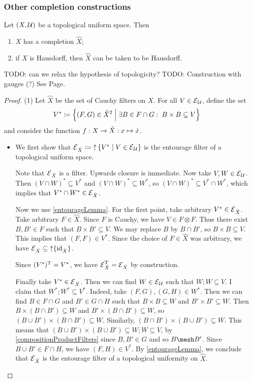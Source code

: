 \subsubsection{Other completion constructions}
\begin{proposition}
Let $\sSet{X, \mathcal{U}}$ be a topological uniform space. Then
\begin{enumerate}
\item $X$ has a completion $\hat{X}$;
\item if $X$ is Hausdorff, then $\hat{X}$ can be taken to be Hausdorff.
\end{enumerate}
\end{proposition}
TODO: can we relax the hypothesis of topologicity? TODO: Construction with gauges (?) See Page.
\begin{proof}
(1) Let $\hat{X}$ be the set of Cauchy filters on $X$. For all $V\in\operatorname{\mathcal{E}}_\mathcal{U}$, define the set
\[ V^* \defeq \setbuilder{(F,G)\in \hat{X}^2}{\exists B\in F\cap G: \; B\times B\subseteq V} \]
and consider the function $f: X\to \hat{X}: x\mapsto \dot{x}$.
\begin{itemize}
\item We first show that $\entourage_{\hat{X}} \defeq \upset\setbuilder{V^*}{V\in \entourage_\mathcal{U}}$ is the entourage filter of a topological uniform space.

Note that $\operatorname{\mathcal{E}}_{\hat{X}}$ is a filter. Upwards closure is immediate. Now take $V,W\in \operatorname{\mathcal{E}}_\mathcal{U}$. Then $(V\cap W)^* \subseteq V^*$ and $(V\cap W)^* \subseteq W^*$, so $(V\cap W)^* \subseteq V^*\cap W^*$, which implies that $V^*\cap W^*\in \operatorname{\mathcal{E}}_{\hat{X}}$.

Now we use \ref{entourageLemma}. For the first point, take arbitrary $V^*\in \operatorname{\mathcal{E}}_{\hat{X}}$. Take arbitrary $F\in \hat{X}$. Since $F$ is Cauchy, we have $V \in F\otimes F$. Thus there exist $B,B'\in F$ such that $B\times B'\subseteq V$. We may replace $B$ by $B\cap B'$, so $B\times B\subseteq V$. This implies that $(F,F) \in V^*$. Since the choice of $F\in \hat{X}$ was arbitrary, we have $\operatorname{\mathcal{E}}_{\hat{X}}\subseteq \operatorname{\uparrow} \{\operatorname{id}_{\hat{X}}\}$.

Since $(V^*)^{\mathrm{T}} = V^*$, we have $\operatorname{\mathcal{E}}_{\hat{X}}^{\mathrm{T}} = \operatorname{\mathcal{E}}_{\hat{X}}$ by construction.

Finally take $V^*\in \operatorname{\mathcal{E}}_{\hat{X}}$. Then we can find $W\in \operatorname{\mathcal{E}}_\mathcal{U}$ such that $W;W\subseteq V$. I claim that $W^*;W^* \subseteq V^*$. Indeed, take $(F,G), (G,H)\in W^*$. Then we can find $B\in F\cap G$ and $B'\in G\cap H$ such that $B\times B\subseteq W$ and $B'\times B'\subseteq W$. Then $B\times (B\cap B')\subseteq W$ and $B'\times (B\cap B')\subseteq W$, so $(B\cup B')\times (B\cap B')\subseteq W$. Similarly, $(B\cap B')\times (B\cup B')\subseteq W$. This means that $(B\cup B')\times (B\cup B')\subseteq W;W \subseteq V$, by \ref{compositionProductFilters} since $B, B'\in G$ and so $B\mesh B'$. Since $B\cup B'\in F\cap H$, we have $(F,H)\in V^*$. By \ref{entourageLemma}, we conclude that $\operatorname{\mathcal{E}}_{\hat{X}}$ is the entourage filter of a topological uniformity on $\hat{X}$.


\end{itemize}
\end{proof}
